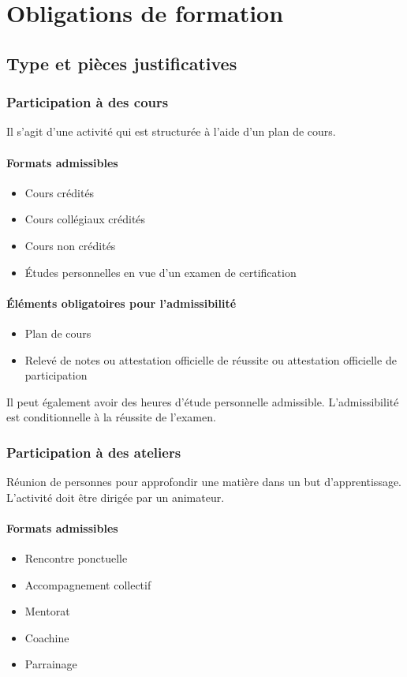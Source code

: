 \section{Obligations de formation}
	\subsection{Type et pièces justificatives}
		\subsubsection{Participation à des cours}
		Il s’agit d’une activité qui est structurée à l’aide d’un plan de cours.
		
		\paragraph{Formats admissibles}
		\begin{itemize}
			\item Cours crédités
			\item Cours collégiaux crédités
			\item Cours non crédités
			\item Études personnelles en vue d'un examen de certification
		\end{itemize}
		
		\paragraph{Éléments obligatoires pour l'admissibilité}
		\begin{itemize}
			\item Plan de cours
			\item Relevé de notes ou attestation officielle de réussite ou attestation officielle de participation
		\end{itemize}
		
		Il peut également avoir des heures d’étude personnelle admissible. L’admissibilité est conditionnelle à la réussite de l’examen.

		\subsubsection{Participation à des ateliers}
		Réunion de personnes pour approfondir une matière dans un but d’apprentissage. L’activité doit être dirigée par un animateur.

		\paragraph{Formats admissibles}
		\begin{itemize}
			\item Rencontre ponctuelle
			\item Accompagnement collectif
			\item Mentorat
			\item Coachine
			\item Parrainage
		\end{itemize}

